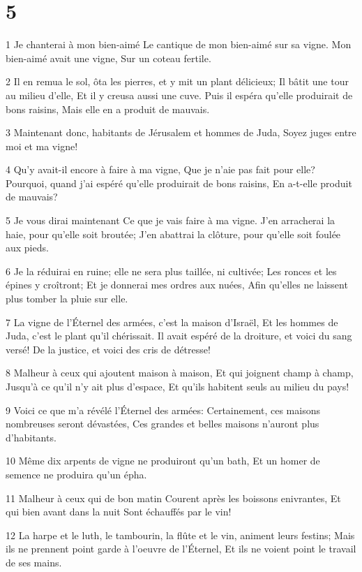 \chapter{5}

\par 1 Je chanterai à mon bien-aimé Le cantique de mon bien-aimé sur sa vigne. Mon bien-aimé avait une vigne, Sur un coteau fertile.
\par 2 Il en remua le sol, ôta les pierres, et y mit un plant délicieux; Il bâtit une tour au milieu d'elle, Et il y creusa aussi une cuve. Puis il espéra qu'elle produirait de bons raisins, Mais elle en a produit de mauvais.
\par 3 Maintenant donc, habitants de Jérusalem et hommes de Juda, Soyez juges entre moi et ma vigne!
\par 4 Qu'y avait-il encore à faire à ma vigne, Que je n'aie pas fait pour elle? Pourquoi, quand j'ai espéré qu'elle produirait de bons raisins, En a-t-elle produit de mauvais?
\par 5 Je vous dirai maintenant Ce que je vais faire à ma vigne. J'en arracherai la haie, pour qu'elle soit broutée; J'en abattrai la clôture, pour qu'elle soit foulée aux pieds.
\par 6 Je la réduirai en ruine; elle ne sera plus taillée, ni cultivée; Les ronces et les épines y croîtront; Et je donnerai mes ordres aux nuées, Afin qu'elles ne laissent plus tomber la pluie sur elle.
\par 7 La vigne de l'Éternel des armées, c'est la maison d'Israël, Et les hommes de Juda, c'est le plant qu'il chérissait. Il avait espéré de la droiture, et voici du sang versé! De la justice, et voici des cris de détresse!
\par 8 Malheur à ceux qui ajoutent maison à maison, Et qui joignent champ à champ, Jusqu'à ce qu'il n'y ait plus d'espace, Et qu'ils habitent seuls au milieu du pays!
\par 9 Voici ce que m'a révélé l'Éternel des armées: Certainement, ces maisons nombreuses seront dévastées, Ces grandes et belles maisons n'auront plus d'habitants.
\par 10 Même dix arpents de vigne ne produiront qu'un bath, Et un homer de semence ne produira qu'un épha.
\par 11 Malheur à ceux qui de bon matin Courent après les boissons enivrantes, Et qui bien avant dans la nuit Sont échauffés par le vin!
\par 12 La harpe et le luth, le tambourin, la flûte et le vin, animent leurs festins; Mais ils ne prennent point garde à l'oeuvre de l'Éternel, Et ils ne voient point le travail de ses mains.
